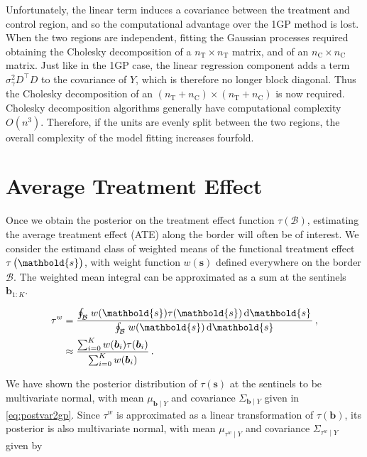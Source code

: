 \documentclass[letter]{article}
\newcommand{\trans}{^{\intercal}}
\newcommand{\treat}{\mathrm{T}}
\newcommand{\ctrol}{\mathrm{C}}
\newcommand{\sigmagamma}{\sigma_{\gamma}}
\newcommand{\svec}{\mathbold{s}}
\newcommand{\boundary}{\mathcal{B}}
\newcommand{\sentinels}{\bm{b}}
\newcommand{\tauw}{\tau^{w}}
\newcommand{\eqlabel}[1]{\label{#1}}
\begin{document}
Unfortunately, the linear term induces a covariance between the treatment and control region, and so the computational advantage over the 1GP method is lost.
When the two regions are independent, fitting the Gaussian processes required obtaining the Cholesky decomposition of a \(n_\treat{} \times n_\treat{}\) matrix, and of an \(n_\ctrol{} \times n_\ctrol{}\) matrix.
Just like in the 1GP case, the linear regression component adds a term \(\sigmagamma^2 D\trans D\) to the covariance of \(Y\), which is therefore no longer block diagonal.
Thus the Cholesky decomposition of an \((n_\treat{}+n_\ctrol{}) \times (n_\treat{}+n_\ctrol{})\) is now required.
Cholesky decomposition algorithms generally have computational complexity \(O(n^3)\).
Therefore, if the units are evenly split between the two regions,
the overall complexity of the model fitting increases fourfold.
    


    	\section{Average Treatment Effect}\label{average-treatment-effect}
    

\label{sec:ate}
    	Once we obtain the posterior on the treatment effect function \(\tau(\boundary)\), estimating the average treatment effect (ATE) along the border will often be of interest.
We consider the estimand class of weighted means of the functional treatment effect \(\tau\del{\svec}\),
with weight function \(w(\svec)\) defined everywhere on the border \(\boundary\).
The weighted mean integral can be approximated as a sum at the sentinels \(\sentinels_{1:K}\).

\begin{equation}\begin{split}
    \tauw &= \frac{\oint_\boundary \left. w(\svec) \tau(\svec) \dif \svec \right.}
                  {\oint_\boundary \left. w(\svec) \dif \svec \right.}\,,\\
          &\approx \frac{\sum_{i=0}^K w(\sentinels_i) \tau(\sentinels_i)}
                       {\sum_{i=0}^K w(\sentinels_i) } \,.
\end{split}
\eqlabel{eq:weighted_estimand}
\end{equation}

We have shown the posterior distribution of \(\tau(\svec)\) at the sentinels to be multivariate normal, with mean \(\mu_{\sentinels \mid Y}\) and covariance \(\Sigma_{\sentinels \mid Y}\) given in \eqref{eq:postvar2gp}.
Since \(\tauw\) is approximated as a linear transformation of \(\tau(\sentinels)\), its posterior is also multivariate normal, with mean \(\mu_{\tauw \mid Y}\) and covariance \(\Sigma_{\tauw \mid Y}\) given by
\end{document}
